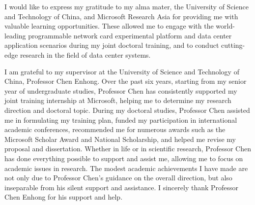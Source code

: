 \begin{acknowledgements}

I would like to express my gratitude to my alma mater, the University of Science and Technology of China, and Microsoft Research Asia for providing me with valuable learning opportunities. These allowed me to engage with the world-leading programmable network card experimental platform and data center application scenarios during my joint doctoral training, and to conduct cutting-edge research in the field of data center systems.

I am grateful to my supervisor at the University of Science and Technology of China, Professor Chen Enhong. Over the past six years, starting from my senior year of undergraduate studies, Professor Chen has consistently supported my joint training internship at Microsoft, helping me to determine my research direction and doctoral topic. During my doctoral studies, Professor Chen assisted me in formulating my training plan, funded my participation in international academic conferences, recommended me for numerous awards such as the Microsoft Scholar Award and National Scholarship, and helped me revise my proposal and dissertation. Whether in life or in scientific research, Professor Chen has done everything possible to support and assist me, allowing me to focus on academic issues in research. The modest academic achievements I have made are not only due to Professor Chen's guidance on the overall direction, but also inseparable from his silent support and assistance. I sincerely thank Professor Chen Enhong for his support and help.


\end{acknowledgements}
